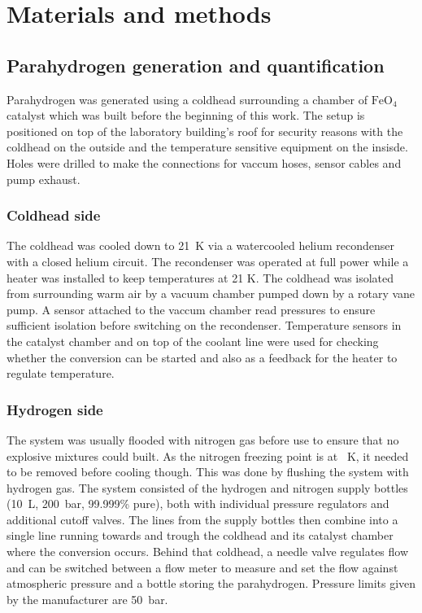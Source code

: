 \chapter{Materials and methods}\label{chap:MaterialsAndMethods}
    \section{Parahydrogen generation and quantification}
    Parahydrogen was generated using a coldhead surrounding a chamber of $\mathrm{FeO_4}$ catalyst which was built before the beginning of this work. The setup is positioned on top of the laboratory building's roof for security reasons with the coldhead on the outside and the temperature sensitive equipment on the insisde. Holes were drilled to make the connections for vaccum hoses, sensor cables and pump exhaust.
        \subsection{Coldhead side}
            The coldhead was cooled down to \SI{21}{\kelvin} via a watercooled helium recondenser with a closed helium circuit. The recondenser was operated at full power while a heater was installed to keep temperatures at 21 K. The coldhead was isolated from surrounding warm air by a vacuum chamber pumped down by a rotary vane pump. A sensor attached to the vaccum chamber read pressures to ensure sufficient isolation before switching on the recondenser. Temperature sensors in the catalyst chamber and on top of the coolant line were used for checking whether the conversion can be started and also as a feedback for the heater to regulate temperature.
        \subsection{Hydrogen side}
            The system was usually flooded with nitrogen gas before use to ensure that no explosive mixtures could built. As the nitrogen freezing point is at \SI{}{\kelvin}, it needed to be removed before cooling though. This was done by flushing the system with hydrogen gas. The system consisted of the hydrogen and nitrogen supply bottles (\SI{10}{\liter}, \SI{200}{\bar}, 99.999\% pure), both with individual pressure regulators and additional cutoff valves. The lines from the supply bottles then combine into a single line running towards and trough the coldhead and its catalyst chamber where the conversion occurs. Behind that coldhead, a needle valve regulates flow and can be switched between a flow meter to measure and set the flow against atmospheric pressure and a bottle storing the parahydrogen. Pressure limits given by the manufacturer are \SI{50}{\bar}. 
